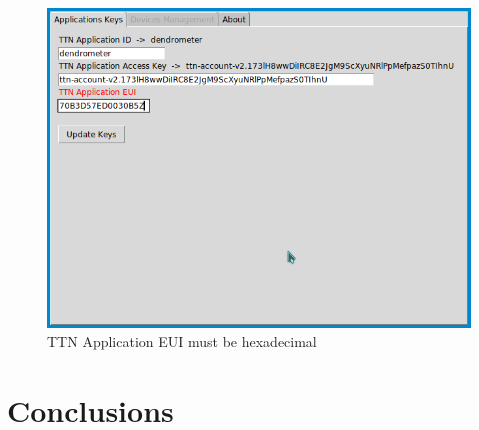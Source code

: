\documentclass[11pt,a4paper,dvipsnames,twoside]{article}
\begin{document}
\begin{figure}[ht]
  \centering
  \includegraphics[width=.9\textwidth]{../pictures/GUI_app_keys_fail.png}
  \caption{TTN Application EUI must be hexadecimal} 
  \label{fig:GUI_app_keys_fail}
\end{figure}


\newpage
\section{Conclusions}





















\newpage
{}
{}
\printbibliography
\end{document}
